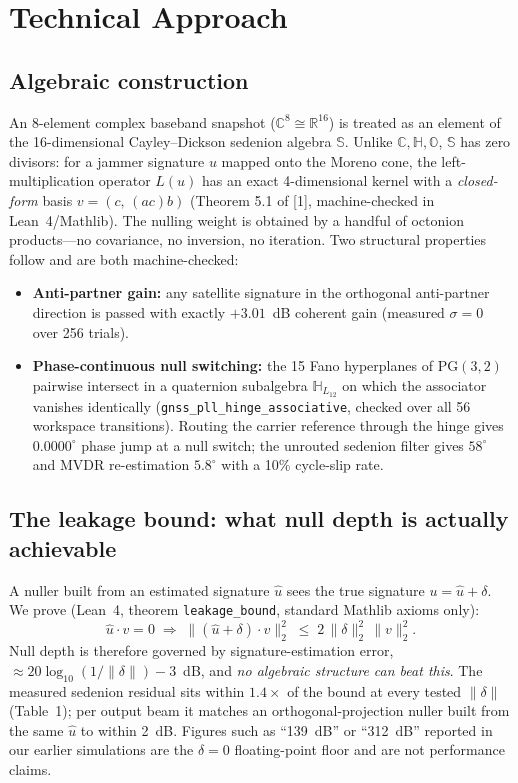 \documentclass[12pt,letterpaper]{article}
\begin{document}
\section{Technical Approach}
\subsection{Algebraic construction}
An 8-element complex baseband snapshot ($\mathbb{C}^8\cong\mathbb{R}^{16}$) is treated as an element of the 16-dimensional Cayley--Dickson sedenion algebra $\mathbb{S}$. Unlike $\mathbb{C},\mathbb{H},\mathbb{O}$, $\mathbb{S}$ has zero divisors: for a jammer signature $u$ mapped onto the Moreno cone, the left-multiplication operator $L(u)$ has an exact 4-dimensional kernel with a \emph{closed-form} basis $v=(c,\,(ac)b)$ (Theorem 5.1 of [1], machine-checked in Lean~4/Mathlib). The nulling weight is obtained by a handful of octonion products---no covariance, no inversion, no iteration. Two structural properties follow and are both machine-checked:
\begin{itemize}[leftmargin=16pt,itemsep=1pt,topsep=1pt]
    \item \textbf{Anti-partner gain:} any satellite signature in the orthogonal anti-partner direction is passed with exactly $+3.01$~dB coherent gain (measured $\sigma=0$ over 256 trials).
    \item \textbf{Phase-continuous null switching:} the 15 Fano hyperplanes of $\mathrm{PG}(3,2)$ pairwise intersect in a quaternion subalgebra $\mathbb{H}_{L_{12}}$ on which the associator vanishes identically (\texttt{gnss\_pll\_hinge\_associative}, checked over all 56 workspace transitions). Routing the carrier reference through the hinge gives $0.0000^\circ$ phase jump at a null switch; the unrouted sedenion filter gives $58^\circ$ and MVDR re-estimation $5.8^\circ$ with a 10\% cycle-slip rate.
\end{itemize}

\subsection{The leakage bound: what null depth is actually achievable}
A nuller built from an estimated signature $\hat u$ sees the true signature $u=\hat u+\delta$. We prove (Lean~4, theorem \texttt{leakage\_bound}, standard Mathlib axioms only):
\[
    \hat u\cdot v = 0 \;\Longrightarrow\; \|(\hat u+\delta)\cdot v\|_2^2 \;\le\; 2\,\|\delta\|_2^2\,\|v\|_2^2 .
\]
Null depth is therefore governed by signature-estimation error, $\approx 20\log_{10}(1/\|\delta\|)-3$~dB, and \emph{no algebraic structure can beat this}. The measured sedenion residual sits within $1.4\times$ of the bound at every tested $\|\delta\|$ (Table~1); per output beam it matches an orthogonal-projection nuller built from the same $\hat u$ to within 2~dB. Figures such as ``139~dB'' or ``312~dB'' reported in our earlier simulations are the $\delta=0$ floating-point floor and are not performance claims.
\end{document}
